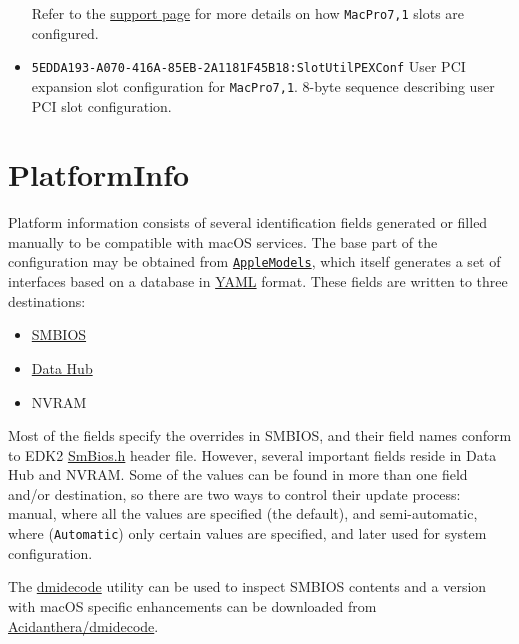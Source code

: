 \documentclass[]{article}
\makeatletter
\providecommand{\tightlist}{%
  \setlength{\itemsep}{0pt}\setlength{\parskip}{0pt}}
\renewcommand{\label}[1]{%
\zref@wrapper@immediate{\oldlabel{#1}}}  %
\makeatother
\begin{document}
\begin{itemize}
  Refer to the \href{https://support.apple.com/HT210104}{support page}
  for more details on how \texttt{MacPro7,1} slots are configured.

\item
  \texttt{5EDDA193-A070-416A-85EB-2A1181F45B18:SlotUtilPEXConf}
  \break
  User PCI expansion slot configuration for \texttt{MacPro7,1}.
  8-byte sequence describing user PCI slot configuration.

\end{itemize}

\section{PlatformInfo}\label{platforminfo}

Platform information consists of several identification fields
generated or filled manually to be compatible with macOS services. The
base part of the configuration may be obtained from
\href{https://github.com/acidanthera/OpenCorePkg/blob/master/AppleModels}{\texttt{AppleModels}},
which itself generates a set of interfaces based on a database
in \href{https://yaml.org/spec/1.2/spec.html}{YAML} format. These fields
are written to three destinations:

\begin{itemize}
\tightlist
\item
  \href{https://www.dmtf.org/standards/smbios}{SMBIOS}
\item
  \href{https://github.com/acidanthera/OpenCorePkg/blob/master/Include/Intel/Protocol/DataHub.h}{Data
  Hub}
\item
  NVRAM
\end{itemize}

Most of the fields specify the overrides in SMBIOS, and their field
names conform to EDK2
\href{https://github.com/acidanthera/audk/blob/master/MdePkg/Include/IndustryStandard/SmBios.h}{SmBios.h}
header file. However, several important fields reside in Data Hub and
NVRAM. Some of the values can be found in more than one field and/or
destination, so there are two ways to control their update process:
manual, where all the values are specified (the default), and semi-automatic,
where (\texttt{Automatic}) only certain values are specified, and later used
for system configuration.

The \href{http://www.nongnu.org/dmidecode}{dmidecode} utility can be used to inspect
SMBIOS contents and a version with macOS specific enhancements can be downloaded
from \href{https://github.com/acidanthera/dmidecode/releases}{Acidanthera/dmidecode}.
\end{document}
